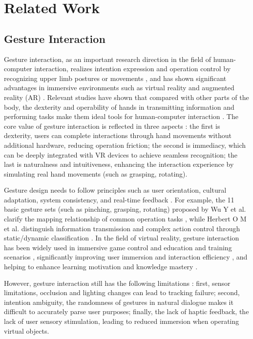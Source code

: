 \documentclass[runningheads]{llncs}
\begin{document}
\section{Related Work}
\subsection{Gesture Interaction}
Gesture interaction, as an important research direction in the field of human-computer interaction, realizes intention expression and operation control by recognizing upper limb postures or movements \cite{yang2019gesture}, and has shown significant advantages in immersive environments such as virtual reality and augmented reality (AR) \cite{10574578}. Relevant studies have shown that compared with other parts of the body, the dexterity and operability of hands in transmitting information and performing tasks make them ideal tools for human-computer interaction \cite{karam2006framework}. The core value of gesture interaction is reflected in three aspects \cite{mitra2007gesture,10580881,app14114935}: the first is dexterity, users can complete interactions through hand movements without additional hardware, reducing operation friction; the second is immediacy, which can be deeply integrated with VR devices to achieve seamless recognition; the last is naturalness and intuitiveness, enhancing the interaction experience by simulating real hand movements (such as grasping, rotating).

Gesture design needs to follow principles such as user orientation, cultural adaptation, system consistency, and real-time feedback \cite{lou2018analysis}. For example, the 11 basic gesture sets (such as pinching, grasping, rotating) proposed by Wu Y et al. clarify the mapping relationship of common operation tasks \cite{wu2024empirical}, while Herbert O M et al. distinguish information transmission and complex action control through static/dynamic classification \cite{herbert2024static}. In the field of virtual reality, gesture interaction has been widely used in immersive game control and education and training scenarios \cite{10574578,lu2024chemical}, significantly improving user immersion and interaction efficiency \cite{10580881}, and helping to enhance learning motivation and knowledge mastery \cite{lu2024chemical}.

However, gesture interaction still has the following limitations \cite{herbert2024static,app14114935}: first, sensor limitations, occlusion and lighting changes can lead to tracking failure; second, intention ambiguity, the randomness of gestures in natural dialogue makes it difficult to accurately parse user purposes; finally, the lack of haptic feedback, the lack of user sensory stimulation, leading to reduced immersion when operating virtual objects.
\end{document}
